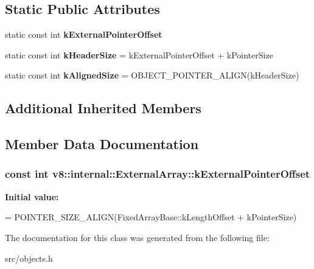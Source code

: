 \subsection*{Static Public Attributes}
\begin{DoxyCompactItemize}
\item 
static const int {\bfseries k\+External\+Pointer\+Offset}
\item 
\hypertarget{classv8_1_1internal_1_1_external_array_a0dd207d630899d66c462211b807fe0cd}{}static const int {\bfseries k\+Header\+Size} = k\+External\+Pointer\+Offset + k\+Pointer\+Size\label{classv8_1_1internal_1_1_external_array_a0dd207d630899d66c462211b807fe0cd}

\item 
\hypertarget{classv8_1_1internal_1_1_external_array_ae3cba510811934c6569daf48e874dd21}{}static const int {\bfseries k\+Aligned\+Size} = O\+B\+J\+E\+C\+T\+\_\+\+P\+O\+I\+N\+T\+E\+R\+\_\+\+A\+L\+I\+G\+N(k\+Header\+Size)\label{classv8_1_1internal_1_1_external_array_ae3cba510811934c6569daf48e874dd21}

\end{DoxyCompactItemize}
\subsection*{Additional Inherited Members}


\subsection{Member Data Documentation}
\hypertarget{classv8_1_1internal_1_1_external_array_ac5904813cf360de5d436873c4bd9f524}{}
\subsubsection[{k\+External\+Pointer\+Offset}]{\setlength{\rightskip}{0pt plus 5cm}const int v8\+::internal\+::\+External\+Array\+::k\+External\+Pointer\+Offset\hspace{0.3cm}{\ttfamily [static]}}\label{classv8_1_1internal_1_1_external_array_ac5904813cf360de5d436873c4bd9f524}
{\bfseries Initial value\+:}
\begin{DoxyCode}
=
      POINTER\_SIZE\_ALIGN(FixedArrayBase::kLengthOffset + kPointerSize)
\end{DoxyCode}


The documentation for this class was generated from the following file\+:\begin{DoxyCompactItemize}
\item 
src/objects.\+h\end{DoxyCompactItemize}
